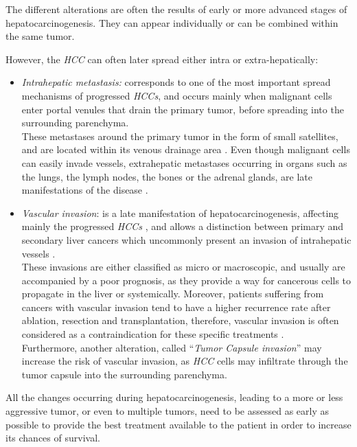 \documentclass[]{article}
\begin{document}
The different alterations are often the results of early or more
advanced stages of hepatocarcinogenesis. They can appear individually or
can be combined within the same tumor.

However, the \emph{HCC} can often later spread either intra or
extra-hepatically:

\begin{itemize}
\item \emph{Intrahepatic metastasis:} corresponds to one of the most
  important spread mechanisms of progressed \emph{HCCs}, and occurs
  mainly when malignant cells enter portal venules that drain the
  primary tumor, before spreading into the surrounding parenchyma.\\
  These metastases around the primary tumor in the form of small
  satellites, and are located within its venous drainage area \cite{Nakashima2003}. Even though malignant cells can
  easily invade vessels, extrahepatic metastases occurring in organs
  such as the lungs, the lymph nodes, the bones or the adrenal glands,
  are late manifestations of the disease \cite{Theise2006, Trevisani2008a}.
\item \emph{Vascular invasion}: is a late manifestation of
  hepatocarcinogenesis, affecting mainly the progressed \emph{HCCs}
  \cite{EdmondsonHA1954}, and allows a distinction between
  primary and secondary liver cancers which uncommonly present an
  invasion of intrahepatic vessels \cite{Okuda1997}.\\
  These invasions are either classified as micro or macroscopic, and
  usually are accompanied by a poor prognosis, as they provide a way for
  cancerous cells to propagate in the liver or systemically. Moreover,
  patients suffering from cancers with vascular invasion tend to have a
  higher recurrence rate after ablation, resection and transplantation,
  therefore, vascular invasion is often considered as a contraindication
  for these specific treatments \cite{Llovet2004}.\\
  Furthermore, another alteration, called ``\emph{Tumor Capsule
  invasion}'' may increase the risk of vascular invasion, as \emph{HCC}
  cells may infiltrate through the tumor capsule into the surrounding
  parenchyma.
\end{itemize}

All the changes occurring during hepatocarcinogenesis, leading to a more
or less aggressive tumor, or even to multiple tumors, need to be
assessed as early as possible to provide the best treatment available to
the patient in order to increase its chances of survival.
\end{document}
